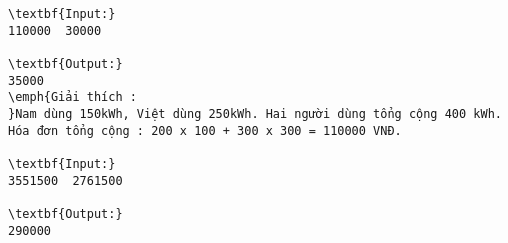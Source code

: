 \begin{verbatim}
\textbf{Input:}
110000  30000

\textbf{Output:}
35000
\emph{Giải thích : 
}Nam dùng 150kWh, Việt dùng 250kWh. Hai người dùng tổng cộng 400 kWh. 
Hóa đơn tổng cộng : 200 x 100 + 300 x 300 = 110000 VNĐ.

\textbf{Input:}
3551500  2761500

\textbf{Output:}
290000

\end{verbatim}